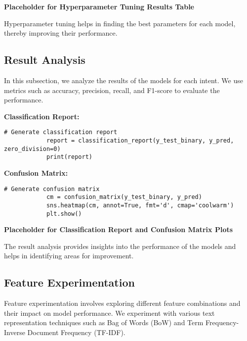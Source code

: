         \textbf{Placeholder for Hyperparameter Tuning Results Table}

        Hyperparameter tuning helps in finding the best parameters for each model, thereby improving their performance.
            
    \subsection{Result Analysis}
    
        In this subsection, we analyze the results of the models for each intent. We use metrics such as accuracy, precision, recall, and F1-score to evaluate the performance.

        \textbf{Classification Report:}
        
        \vspace{0.5em}

        \begin{lstlisting}[caption={Generate classification report}, label={lst:classification_report}]
            # Generate classification report
            report = classification_report(y_test_binary, y_pred, zero_division=0)
            print(report)
        \end{lstlisting}

        \textbf{Confusion Matrix:}
        
        \vspace{0.5em}

        \begin{lstlisting}[caption={Generate confusion matrix}, label={lst:confusion_matrix}]
            # Generate confusion matrix
            cm = confusion_matrix(y_test_binary, y_pred)
            sns.heatmap(cm, annot=True, fmt='d', cmap='coolwarm')
            plt.show()
        \end{lstlisting}

        \textbf{Placeholder for Classification Report and Confusion Matrix Plots}

        The result analysis provides insights into the performance of the models and helps in identifying areas for improvement.
            
    \subsection{Feature Experimentation}
    
        Feature experimentation involves exploring different feature combinations and their impact on model performance. We experiment with various text representation techniques such as Bag of Words (BoW) and Term Frequency-Inverse Document Frequency (TF-IDF).

